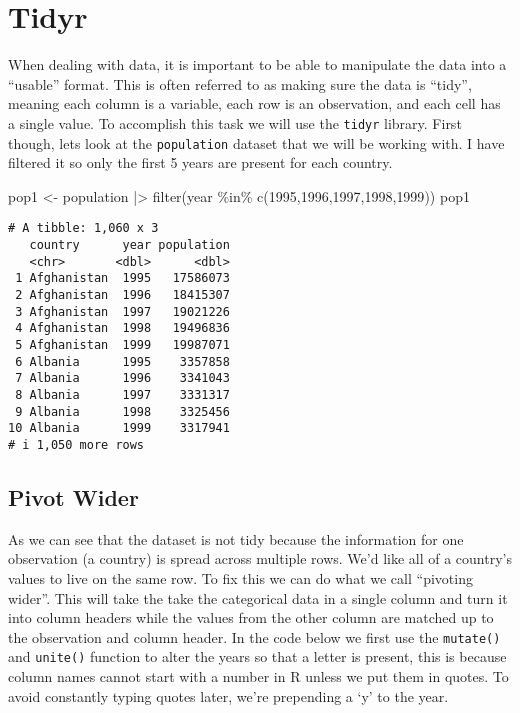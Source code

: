 \documentclass[
  letterpaper,
  DIV=11,
  numbers=noendperiod]{scrreprt}
\newenvironment{Shaded}{\begin{snugshade}}{\end{snugshade}}
\newcommand{\DecValTok}[1]{\textcolor[rgb]{0.68,0.00,0.00}{#1}}
\newcommand{\FunctionTok}[1]{\textcolor[rgb]{0.28,0.35,0.67}{#1}}
\newcommand{\NormalTok}[1]{\textcolor[rgb]{0.00,0.23,0.31}{#1}}
\newcommand{\OtherTok}[1]{\textcolor[rgb]{0.00,0.23,0.31}{#1}}
\newcommand{\SpecialCharTok}[1]{\textcolor[rgb]{0.37,0.37,0.37}{#1}}
\begin{document}
\section{Tidyr}\label{tidyr}

When dealing with data, it is important to be able to manipulate the
data into a ``usable'' format. This is often referred to as making sure
the data is ``tidy'', meaning each column is a variable, each row is an
observation, and each cell has a single value. To accomplish this task
we will use the \texttt{tidyr} library. First though, lets look at the
\texttt{population} dataset that we will be working with. I have
filtered it so only the first 5 years are present for each country.

\begin{Shaded}
\begin{Highlighting}[]
\NormalTok{pop1 }\OtherTok{\textless{}{-}}\NormalTok{ population }\SpecialCharTok{|\textgreater{}} \FunctionTok{filter}\NormalTok{(year }\SpecialCharTok{\%in\%} \FunctionTok{c}\NormalTok{(}\DecValTok{1995}\NormalTok{,}\DecValTok{1996}\NormalTok{,}\DecValTok{1997}\NormalTok{,}\DecValTok{1998}\NormalTok{,}\DecValTok{1999}\NormalTok{))}
\NormalTok{pop1}
\end{Highlighting}
\end{Shaded}

\begin{verbatim}
# A tibble: 1,060 x 3
   country      year population
   <chr>       <dbl>      <dbl>
 1 Afghanistan  1995   17586073
 2 Afghanistan  1996   18415307
 3 Afghanistan  1997   19021226
 4 Afghanistan  1998   19496836
 5 Afghanistan  1999   19987071
 6 Albania      1995    3357858
 7 Albania      1996    3341043
 8 Albania      1997    3331317
 9 Albania      1998    3325456
10 Albania      1999    3317941
# i 1,050 more rows
\end{verbatim}

\subsection{Pivot Wider}\label{pivot-wider}

As we can see that the dataset is not tidy because the information for
one observation (a country) is spread across multiple rows. We'd like
all of a country's values to live on the same row. To fix this we can do
what we call ``pivoting wider''. This will take the take the categorical
data in a single column and turn it into column headers while the values
from the other column are matched up to the observation and column
header. In the code below we first use the \texttt{mutate()} and
\texttt{unite()} function to alter the years so that a letter is
present, this is because column names cannot start with a number in R
unless we put them in quotes. To avoid constantly typing quotes later,
we're prepending a `y' to the year.
\end{document}
